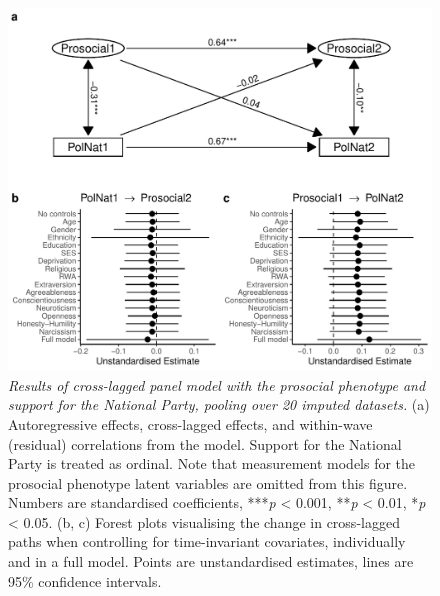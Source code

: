 \documentclass[
  man,floatsintext]{apa6}
\begin{document}
\begin{figure}
\centering
\includegraphics{manuscript_files/figure-latex/clpmPlotPolNatdMReduced-1.pdf}
\caption{\label{fig:clpmPlotPolNatdMReduced}\emph{Results of cross-lagged panel model with
the prosocial phenotype and support for the National Party, pooling over 20
imputed datasets.} (a) Autoregressive effects, cross-lagged effects, and
within-wave (residual) correlations from the model. Support for the National
Party is treated as ordinal. Note that measurement models for the prosocial
phenotype latent variables are omitted from this figure. Numbers are
standardised coefficients, ***\emph{p} \textless{} 0.001, **\emph{p} \textless{} 0.01, *\emph{p} \textless{} 0.05.
(b, c) Forest plots visualising the change in cross-lagged paths when
controlling for time-invariant covariates, individually and in a full model.
Points are unstandardised estimates, lines are 95\% confidence intervals.}
\end{figure}

\newpage
\end{document}
